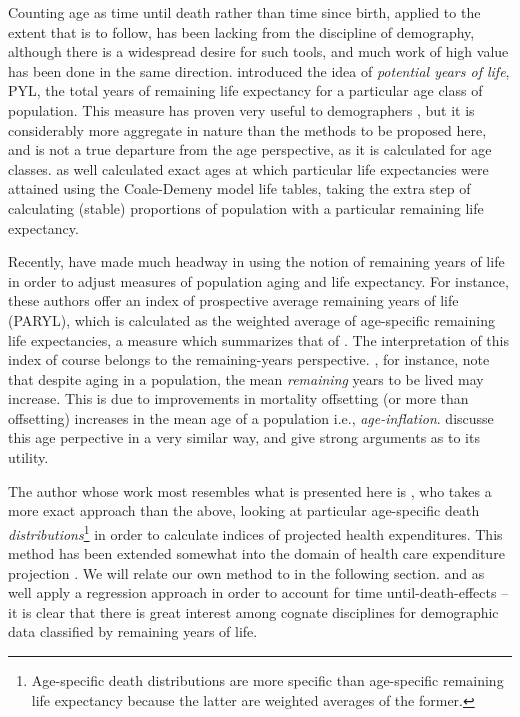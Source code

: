 Counting age as time until death rather than time
since birth, applied to the extent that is to
follow, has been lacking from the discipline of demography, although there is a
widespread desire for such tools, and much work of high value has been done in
the same direction. \citet{hersch1944demographie}
introduced the idea of \textit{potential years of life}, PYL, the
total years of remaining life expectancy for a particular age class of
population. This measure has proven very useful to demographers
\citep{panush1996potential}, but it is considerably more aggregate in 
nature than the methods to be proposed
here, and is not a true departure from the age perspective, as it is calculated
for age classes. \citet{ryder1975notes} as well calculated exact ages at which
particular life expectancies were attained using the Coale-Demeny model
life tables, taking the extra step of calculating (stable) proportions
of population with a particular remaining life expectancy.

Recently, 
\citet{sanderson2005average, sanderson2010remeasuring} have made much
headway in using the notion of remaining years of life in
 order to adjust measures of population aging and life expectancy. For instance, 
 these authors offer an index of prospective average remaining years of life
 (PARYL), which is calculated as the weighted average of age-specific 
 remaining life expectancies, a measure which summarizes that of
 \citet{hersch1944demographie}. The interpretation of this index of
 course belongs to the remaining-years perspective.
 \citet{sanderson2005average}, for instance, note that despite aging 
 in a population, the mean \textit{remaining} years to 
 be lived may increase. This is due to improvements in mortality offsetting 
 (or more than offsetting) increases in the mean age of a population i.e.,
 \textit{age-inflation}\citep{shoven2010adjusting}. \citet{sanderson2007new}
 discusse this age perpective in a very similar way, and give strong arguments
 as to its utility.

The author whose work most resembles what is
presented here is \citet{miller2001increasing}, who takes a more
exact approach than the above, looking at particular age-specific death
\textit{distributions}\footnote{Age-specific death distributions are more
 specific than age-specific remaining life expectancy because the latter are
 weighted averages of the former.} in order to calculate indices
 of projected health expenditures. This method has been extended somewhat into
 the domain of health care expenditure projection
 \citep{lee2002approach,lee2007demographic,topoleski2004uncertainty}. We will
 relate our own method to \citet{miller2001increasing} in the
 following section. \citet{stearns2004time} and \citet{seshamani2004longitudinal} as well apply a regression approach in
 order to account for time until-death-effects -- it is clear that there is
 great interest among cognate disciplines for demographic data classified by remaining
 years of life.
 
